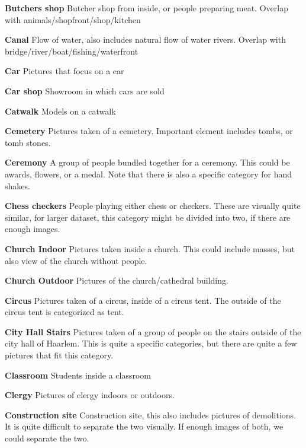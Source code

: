 \noindent\textbf{Butchers shop}
Butcher shop from inside, or people preparing meat. Overlap with animals/shopfront/shop/kitchen


\noindent\textbf{Canal}
Flow of water, also includes natural flow of water rivers. Overlap with bridge/river/boat/fishing/waterfront

\noindent\textbf{Car}
Pictures that focus on a car

\noindent\textbf{Car shop}
Showroom in which cars are sold 

%

\noindent\textbf{Catwalk}
Models on a catwalk

\noindent\textbf{Cemetery}
Pictures taken of a cemetery. Important element includes tombs, or tomb stones. 

\noindent\textbf{Ceremony}
A group of people bundled together for a ceremony. This could be awards, flowers, or a medal. Note that there is also a specific category for hand shakes. 

\noindent\textbf{Chess checkers}
People playing either chess or checkers. These are visually quite similar, for larger dataset, this category might be divided into two, if there are enough images.

\noindent\textbf{Church Indoor}
Pictures taken inside a church. This could include masses, but also view of the church without people. 

\noindent\textbf{Church Outdoor}
Pictures of the church/cathedral building.

\noindent\textbf{Circus}
Pictures taken of a circus, inside of a circus tent. The outside of the circus tent is categorized as tent. 

\noindent\textbf{City Hall Stairs}
Pictures taken of a group of people on the stairs outside of the city hall of Haarlem. This is quite a specific categories, but there are quite a few pictures that fit this category. 

\noindent\textbf{Classroom}
Students inside a classroom

\noindent\textbf{Clergy}
Pictures of clergy indoors or outdoors.


\noindent\textbf{Construction site}
Construction site, this also includes pictures of demolitions. It is quite difficult to separate the two visually. If enough images of both, we could separate the two. 


